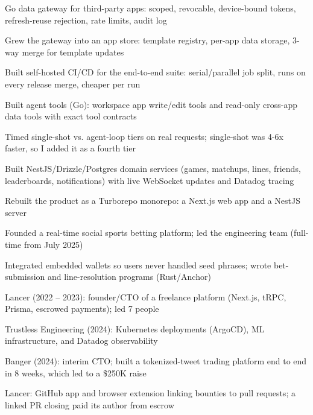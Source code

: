 \documentclass[print]{jack-resume}
\begin{document}
\begin{tightemize}
    \item Go data gateway for third-party apps: scoped, revocable, device-bound tokens, refresh-reuse rejection, rate limits, audit log
    \item Grew the gateway into an app store: template registry, per-app data storage, 3-way merge for template updates
    \item Built self-hosted CI/CD for the end-to-end suite: serial/parallel job split, runs on every release merge, cheaper per run
    \item Built agent tools (Go): workspace app write/edit tools and read-only cross-app data tools with exact tool contracts
    \item Timed single-shot vs. agent-loop tiers on real requests; single-shot was 4-6x faster, so I added it as a fourth tier
\end{tightemize}
\sectionsep

\begin{tightemize}
    \item Built NestJS/Drizzle/Postgres domain services (games, matchups, lines, friends, leaderboards, notifications) with live WebSocket updates and Datadog tracing
    \item Rebuilt the product as a Turborepo monorepo: a Next.js web app and a NestJS server
    \item Founded a real-time social sports betting platform; led the engineering team (full-time from July 2025)
    \item Integrated embedded wallets so users never handled seed phrases; wrote bet-submission and line-resolution programs (Rust/Anchor)
\end{tightemize}
\sectionsep

\begin{tightemize}
    \item Lancer (2022 -- 2023): founder/CTO of a freelance platform (Next.js, tRPC, Prisma, escrowed payments); led 7 people
    \item Trustless Engineering (2024): Kubernetes deployments (ArgoCD), ML infrastructure, and Datadog observability
    \item Banger (2024): interim CTO; built a tokenized-tweet trading platform end to end in 8 weeks, which led to a \$250K raise
    \item Lancer: GitHub app and browser extension linking bounties to pull requests; a linked PR closing paid its author from escrow
\end{tightemize}
\sectionsep
\end{document}
